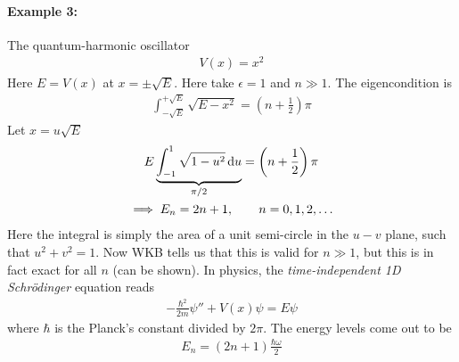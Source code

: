 \paragraph{Example 3:} The quantum-harmonic oscillator
\begin{gather*}
	V(x) = x^2
\end{gather*}
Here $E=V(x)$ at $x = \pm \sqrt{E}$. Here take $\epsilon=1$ and $n\gg 1$. The eigencondition is
\begin{align*}
	\int_{-\sqrt{E}}^{+\sqrt{E}} \sqrt{E - x^2} = \left(n+ \frac{1}{2}\right) \pi 
\end{align*} 
Let $x=u\sqrt{E}$ 
\begin{gather*}
	E \underbrace{\int_{-1}^{1} \sqrt{1 - u^2} \, \mathrm{d} u}_{\pi/2} = \left(n+\frac{1}{2}\right) \pi \\
	\implies E_n = 2n+1, \qquad n=0,1,2,\dots 
\end{gather*}
Here the integral is simply the area of a unit semi-circle in the $u-v$ plane, such that $u^2+v^2=1$. Now WKB tells us that this is valid for $n\gg 1$, but this is in fact exact for all $n$ (can be shown). In physics, the \emph{time-independent 1D Schr\"odinger} equation reads
\begin{gather*}
	-\frac{\hbar^2}{2m} \psi '' + V(x) \psi = E \psi 
\end{gather*}
where $\hbar$ is the Planck's constant divided by $2\pi$. The energy levels come out to be
\begin{gather*}
	E_n = \left(2n+1\right) \frac{\hbar \omega}{2} 
\end{gather*}


